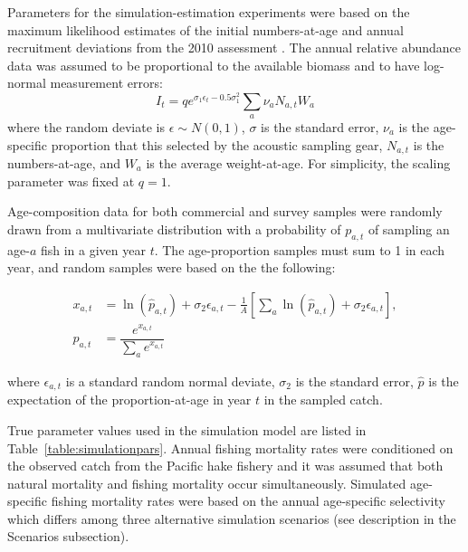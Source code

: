 Parameters for the simulation-estimation experiments were based on the maximum likelihood estimates of the initial numbers-at-age and annual recruitment deviations from the 2010 assessment  \citep{Martell2009}. The annual relative abundance data was assumed to be proportional to the available biomass and to have log-normal measurement errors:
\begin{equation}\label{eq:surveyIndex}
	I_t = q e^{\sigma_1\epsilon_t - 0.5\sigma_1^2} \sum_a \nu_a N_{a,t}  W_a 
\end{equation}
where the random deviate is $\epsilon \sim N(0,1)$, $\sigma$ is the standard error, $\nu_a$ is the age-specific proportion that this selected by the acoustic sampling gear, $N_{a,t}$ is the numbers-at-age, and $W_a$ is the average weight-at-age.  For simplicity, the scaling parameter was fixed at $q=1$.

Age-composition data for both commercial and survey samples were randomly drawn from a multivariate distribution with a probability of $p_{a,t}$ of sampling an age-$a$ fish in a given year $t$.  The age-proportion samples must sum to 1 in each year, and random samples were based on the the following:

\begin{align}
	x_{a,t} &= \ln(\hat{p}_{a,t}) + \sigma_2 \epsilon_{a,t} - \frac{1}{A}
	\left[\sum_a \ln(\hat{p}_{a,t}) + \sigma_2 \epsilon_{a,t} \right],\nonumber \\ 
	p_{a,t} &= \dfrac{e^{x_{a,t}}}{\sum_{a} e^{x_{a,t}} } \label{eq:ageProportion}
\end{align}

where $\epsilon_{a,t}$ is a standard random normal deviate, $\sigma_2$ is the standard error, $\hat{p}$ is the expectation of the proportion-at-age in year $t$ in the sampled catch.

True parameter values used in the simulation model are listed in Table~\ref{table:simulationpars}.  Annual fishing mortality rates were conditioned on the observed catch from the Pacific hake fishery and it was assumed that both natural mortality and fishing mortality occur simultaneously.  Simulated age-specific fishing mortality rates were based on the annual age-specific selectivity which differs among three alternative simulation scenarios (see description in the Scenarios subsection).

